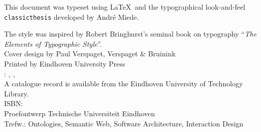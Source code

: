\thispagestyle{empty}

\hfill

\vfill

\noindent
This document was typeset using \LaTeX~and the typographical look-and-feel \texttt{classicthesis} developed by Andr\'e Miede.
 
The style was inspired by Robert Bringhurst's seminal book on typography ``\emph{The Elements of Typographic Style}''.\\

\noindent
Cover design by Paul Verspaget, Verspaget \& Bruinink\\

\noindent
Printed by Eindhoven University Press\\

\noindent\myName: \textit{\myTitle,} \mySubtitle, %
\textcopyright\ \myTime\\

\noindent
A catalogue record is available from the Eindhoven University of Technology Library.\\
ISBN: \\

\noindent
Proefontwerp Technische Universiteit Eindhoven\\
Trefw.: Ontologies, Semantic Web, Software Architecture, Interaction Design


%
%
%
%
%
